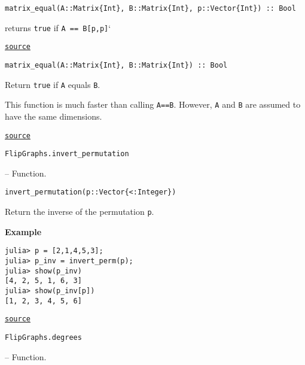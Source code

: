 \begin{adjustwidth}{2em}{0pt}


\begin{verbatim}
matrix_equal(A::Matrix{Int}, B::Matrix{Int}, p::Vector{Int}) :: Bool
\end{verbatim}

returns \texttt{true} if \texttt{A == B[p,p]}`



\href{https://github.com/schto223/FlipGraphs.jl/blob/490c01a7adf74b42f27dda05099165c47ae8133e/src/generalUtilities.jl#L201-L205}{\texttt{source}}



\begin{verbatim}
matrix_equal(A::Matrix{Int}, B::Matrix{Int}) :: Bool
\end{verbatim}

Return \texttt{true} if \texttt{A} equals \texttt{B}. 

This function is much faster than calling \texttt{A==B}. However, \texttt{A} and \texttt{B} are assumed to have the same dimensions.



\href{https://github.com/schto223/FlipGraphs.jl/blob/490c01a7adf74b42f27dda05099165c47ae8133e/src/generalUtilities.jl#L217-L223}{\texttt{source}}


\end{adjustwidth}
\hypertarget{8511433467110044213}{\texttt{FlipGraphs.invert\_permutation}}  -- {Function.}

\begin{adjustwidth}{2em}{0pt}


\begin{verbatim}
invert_permutation(p::Vector{<:Integer})
\end{verbatim}

Return the inverse of the permutation \texttt{p}. 

\textbf{Example}


\begin{verbatim}
julia> p = [2,1,4,5,3];
julia> p_inv = invert_perm(p); 
julia> show(p_inv)
[4, 2, 5, 1, 6, 3]
julia> show(p_inv[p])
[1, 2, 3, 4, 5, 6]
\end{verbatim}



\href{https://github.com/schto223/FlipGraphs.jl/blob/490c01a7adf74b42f27dda05099165c47ae8133e/src/generalUtilities.jl#L169-L183}{\texttt{source}}


\end{adjustwidth}
\hypertarget{7908214606729723836}{\texttt{FlipGraphs.degrees}}  -- {Function.}

